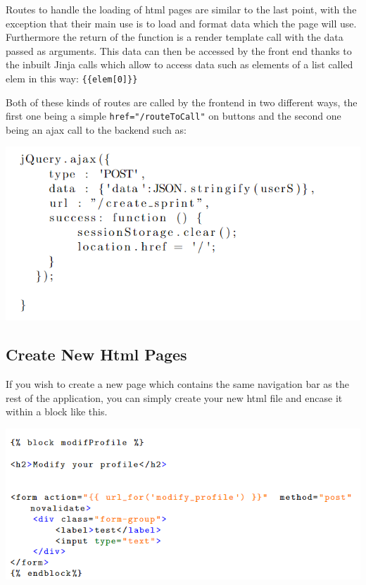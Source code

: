 \documentclass{article}
\begin{document}
Routes to handle the loading of html pages are similar to the last point, with the exception that their main use is to load and format data which the page will use. Furthermore the return of the function is a render template call with the data passed as arguments. This data can then be accessed by the front end thanks to the inbuilt Jinja calls which allow to access data such as elements of a list called elem in this way: \verb|{{elem[0]}}| 


Both of these kinds of routes are called by the frontend in two different ways, the first one being a simple \verb|href="/routeToCall"| on buttons and the second one being an ajax call to the backend such as:

\begin{center}
    \includegraphics[]{ajaxCall.png}
\end{center}

\newpage

\subsection{Create New Html Pages}
If you wish to create a new page which contains the same navigation bar as the rest of the application, you can simply create your new html file and encase it within a block like this.

\begin{center}
    \includegraphics[scale=0.6]{htmlBlockDecl.png}   
\end{center}
\end{document}
